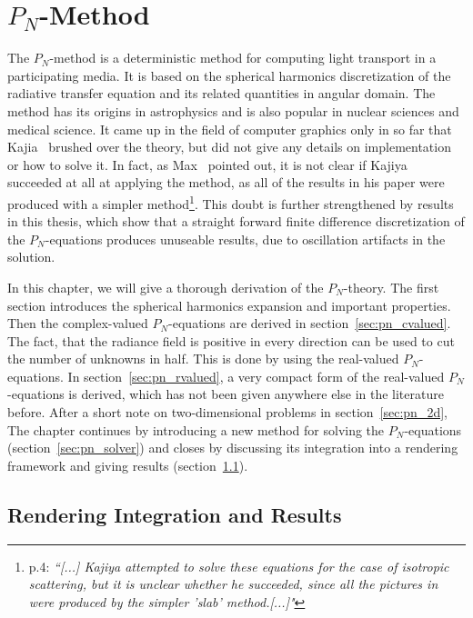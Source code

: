 \chapter{$P_N$-Method}
%
\label{sec:pnmethod}

The $P_N$-method is a deterministic method for computing light transport in a participating media. It is based on the spherical harmonics discretization of the radiative transfer equation and its related quantities in angular domain. The method has its origins in astrophysics and is also popular in nuclear sciences and medical science. It came up in the field of computer graphics only in so far that Kajia~\cite{Kajiya84} brushed over the theory, but did not give any details on implementation or how to solve it. In fact, as Max~\cite{Max95} pointed out, it is not clear if Kajiya succeeded at all at applying the method, as all of the results in his paper were produced with a simpler method\footnote{\cite{Max95} p.4: \emph{``[...] Kajiya attempted to solve these equations for the case of isotropic scattering, but it is unclear whether he succeeded, since all the pictures in \cite{Kajiya84} were produced by the simpler 'slab' method.[...]"}}. This doubt is further strengthened by results in this thesis, which show that a straight forward finite difference discretization of the $P_N$-equations produces unuseable results, due to oscillation artifacts in the solution. 

In this chapter, we will give a thorough derivation of the $P_N$-theory. The first section introduces the spherical harmonics expansion and important properties. Then the complex-valued $P_N$-equations are derived in section~\ref{sec:pn_cvalued}. The fact, that the radiance field is positive in every direction can be used to cut the number of unknowns in half. This is done by using the real-valued $P_N$-equations. In section~\ref{sec:pn_rvalued}, a very compact form of the real-valued $P_N$-equations is derived, which has not been given anywhere else in the literature before. After a short note on two-dimensional problems in section~\ref{sec:pn_2d}, The chapter continues by introducing a new method for solving the $P_N$-equations (section~\ref{sec:pn_solver}) and closes by discussing its integration into a rendering framework and giving results (section~\ref{sec:pn_results}).








\section{Rendering Integration and Results}
\label{sec:pn_results}
